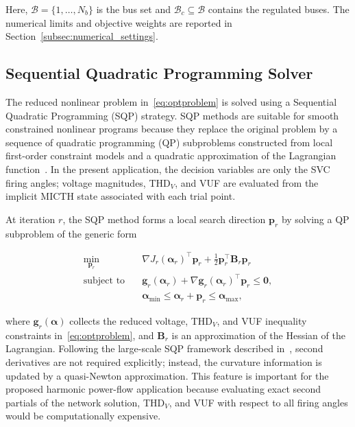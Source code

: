 \documentclass[journal]{IEEEtran}
\begin{document}
Here, $\mathcal{B}=\{1,\ldots,N_b\}$ is the bus set and
$\mathcal{B}_c\subseteq\mathcal{B}$ contains the regulated buses. The numerical
limits and objective weights are reported in
Section~\ref{subsec:numerical_settings}.

\subsection{Sequential Quadratic Programming Solver}
\label{subsec:sqp_solver}

The reduced nonlinear problem in~\eqref{eq:optproblem} is solved using a
Sequential Quadratic Programming (SQP) strategy. SQP methods are suitable for
smooth constrained nonlinear programs because they replace the original problem
by a sequence of quadratic programming (QP) subproblems constructed from local
first-order constraint models and a quadratic approximation of the Lagrangian
function~\cite{Gill2005SNOPT}. In the present application, the decision
variables are only the SVC firing angles; voltage magnitudes, THD$_V$, and VUF
are evaluated from the implicit MICTH state associated with each trial point.

At iteration $r$, the SQP method forms a local search direction
$\mathbf{p}_r$ by solving a QP subproblem of the generic form

\begin{equation}
\begin{aligned}
    \min_{\mathbf{p}_r} \quad
        & \nabla J_r(\boldsymbol{\alpha}_r)^{\top}\mathbf{p}_r
          + \frac{1}{2}\mathbf{p}_r^{\top}\mathbf{B}_r\mathbf{p}_r \\
    \text{subject to} \quad
        & \mathbf{g}_r(\boldsymbol{\alpha}_r)
          + \nabla\mathbf{g}_r(\boldsymbol{\alpha}_r)^{\top}\mathbf{p}_r
          \leq \mathbf{0}, \\
        & \boldsymbol{\alpha}_{\min}
          \leq \boldsymbol{\alpha}_r + \mathbf{p}_r
          \leq \boldsymbol{\alpha}_{\max},
\end{aligned}
\label{eq:sqp_qp}
\end{equation}

\noindent where $\mathbf{g}_r(\boldsymbol{\alpha})$ collects the reduced
voltage, THD$_V$, and VUF inequality constraints in~\eqref{eq:optproblem}, and
$\mathbf{B}_r$ is an approximation of the Hessian of the Lagrangian. Following
the large-scale SQP framework described in~\cite{Gill2005SNOPT}, second
derivatives are not required explicitly; instead, the curvature information is
updated by a quasi-Newton approximation. This feature is important for the
proposed harmonic power-flow application because evaluating exact second
partials of the network solution, THD$_V$, and VUF with respect to all firing
angles would be computationally expensive.
\end{document}
